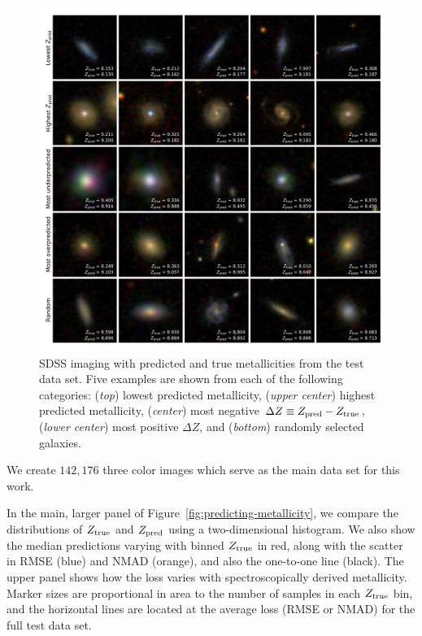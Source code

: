 \documentclass[fleqn,usenatbib]{mnras}
\begin{document}
\begin{figure}
	\includegraphics[width=\textwidth]{01-prediction_examples.pdf}
	\caption{\label{fig:examples}
		SDSS imaging with predicted and true metallicities from the test data set. 
		Five examples are shown from each of the following categories: (\textit{top}) lowest predicted metallicity, (\textit{upper center}) highest predicted metallicity, (\textit{center}) most negative $\Delta Z \equiv Z_{\rm pred} - Z_{\rm true}$, (\textit{lower center}) most positive $\Delta Z$, and (\textit{bottom}) randomly selected galaxies.}
\end{figure}

We create $142,176$ three color images which serve as the main data set for this work.

In the main, larger panel of Figure~\ref{fig:predicting-metallicity}, we compare the distributions of $Z_{\rm true}$ and $Z_{\rm pred}$ using a two-dimensional histogram.
We also show the median predictions varying with binned $Z_{\rm true}$ in red, along with the scatter in RMSE (blue) and NMAD (orange), and also the one-to-one line (black).
The upper panel shows how the loss varies with spectroscopically derived metallicity.
Marker sizes are proportional in area to the number of samples in each $Z_{\rm true}$ bin, and the horizontal lines are located at the average loss (RMSE or NMAD) for the full test data set.
\end{document}
